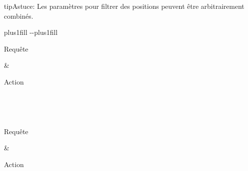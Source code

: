 \documentclass[letterpaper,10pt,french]{sphinxmanual}
\begin{document}
\begin{sphinxadmonition}{tip}{Astuce:}
\sphinxAtStartPar
Les paramètres pour filtrer des positions peuvent être arbitrairement
combinés.
\end{sphinxadmonition}


\begin{savenotes}
\sphinxatlongtablestart
\sphinxthistablewithglobalstyle
\makeatletter
  \LTleft \@totalleftmargin plus1fill
  \LTright\dimexpr\columnwidth-\@totalleftmargin-\linewidth\relax plus1fill
\makeatother
\begin{longtable}{}
\sphinxtoprule
\begin{varwidth}[t]{}
\sphinxstyletheadfamily \sphinxAtStartPar
Requête
\sphinxbeforeendvarwidth
\end{varwidth}%
&\begin{varwidth}[t]{}
\sphinxstyletheadfamily \sphinxAtStartPar
Action
\sphinxbeforeendvarwidth
\end{varwidth}%
\\
\sphinxmidrule
\endfirsthead

\\
\sphinxtoprule
\begin{varwidth}[t]{}
\sphinxstyletheadfamily \sphinxAtStartPar
Requête
\sphinxbeforeendvarwidth
\end{varwidth}%
&\begin{varwidth}[t]{}
\sphinxstyletheadfamily \sphinxAtStartPar
Action
\sphinxbeforeendvarwidth
\end{varwidth}%
\\
\sphinxmidrule
\endhead

\sphinxbottomrule
{}\\
\endfoot


\end{longtable}
\end{savenotes}
\end{document}
